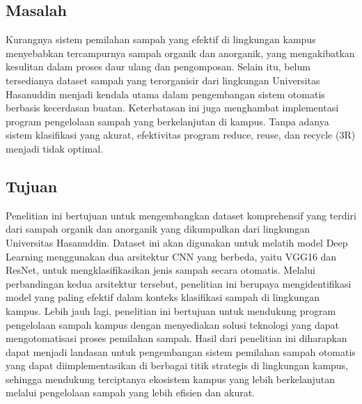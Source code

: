 \documentclass[12pt,a4paper]{article}
\begin{document}
\subsection{Masalah}
\begin{adjustwidth}{3em}{0pt} 
\hspace{0.5cm} Kurangnya sistem pemilahan sampah yang efektif di lingkungan kampus menyebabkan tercampurnya sampah organik dan anorganik, yang mengakibatkan kesulitan dalam proses daur ulang dan pengomposan. Selain itu, belum tersedianya dataset sampah yang terorganisir dari lingkungan Universitas Hasanuddin menjadi kendala utama dalam pengembangan sistem otomatis berbasis kecerdasan buatan. Keterbatasan ini juga menghambat implementasi program pengelolaan sampah yang berkelanjutan di kampus. Tanpa adanya sistem klasifikasi yang akurat, efektivitas program reduce, reuse, dan recycle (3R) menjadi tidak optimal. \end{adjustwidth}

\subsection{Tujuan}
\begin{adjustwidth}{3em}{0pt} 
\hspace{0.5cm} Penelitian ini bertujuan untuk mengembangkan dataset komprehensif yang terdiri dari sampah organik dan anorganik yang dikumpulkan dari lingkungan Universitas Hasanuddin. Dataset ini akan digunakan untuk melatih model Deep Learning menggunakan dua arsitektur CNN yang berbeda, yaitu VGG16 dan ResNet, untuk mengklasifikasikan jenis sampah secara otomatis. Melalui perbandingan kedua arsitektur tersebut, penelitian ini berupaya mengidentifikasi model yang paling efektif dalam konteks klasifikasi sampah di lingkungan kampus. Lebih jauh lagi, penelitian ini bertujuan untuk mendukung program pengelolaan sampah kampus dengan menyediakan solusi teknologi yang dapat mengotomatisasi proses pemilahan sampah. Hasil dari penelitian ini diharapkan dapat menjadi landasan untuk pengembangan sistem pemilahan sampah otomatis yang dapat diimplementasikan di berbagai titik strategis di lingkungan kampus, sehingga mendukung terciptanya ekosistem kampus yang lebih berkelanjutan melalui pengelolaan sampah yang lebih efisien dan akurat.
\end{adjustwidth}


\end{document}
